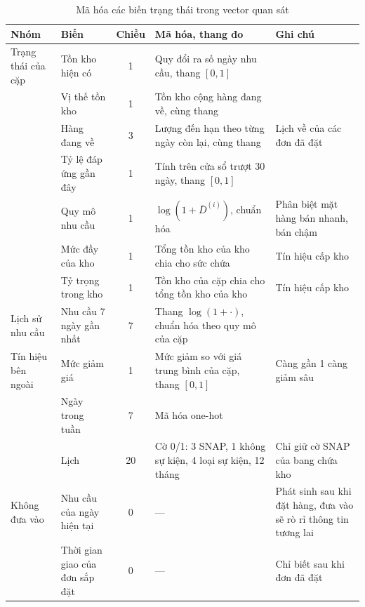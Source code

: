 \begin{table}[htbp]
    \centering
    \caption{Mã hóa các biến trạng thái trong vector quan sát}
    \label{tab:doiChieuState}
    \small
    \begin{tabular}{|>{\raggedright\arraybackslash}p{2.0cm}|>{\raggedright\arraybackslash}p{3.1cm}|c|>{\raggedright\arraybackslash}p{4.0cm}|>{\raggedright\arraybackslash}p{3.15cm}|}
        \hline
        Nhóm & Biến & Chiều & Mã hóa, thang đo & Ghi chú \\
        \hline
        Trạng thái của cặp & Tồn kho hiện có & 1 & Quy đổi ra số ngày nhu cầu, thang $[0,1]$ & \\ \cline{2-5}
         & Vị thế tồn kho & 1 & Tồn kho cộng hàng đang về, cùng thang & \\ \cline{2-5}
         & Hàng đang về & 3 & Lượng đến hạn theo từng ngày còn lại, cùng thang & Lịch về của các đơn đã đặt \\ \cline{2-5}
         & Tỷ lệ đáp ứng gần đây & 1 & Tính trên cửa sổ trượt 30 ngày, thang $[0,1]$ & \\ \cline{2-5}
         & Quy mô nhu cầu & 1 & $\log(1 + \bar{D}^{(i)})$, chuẩn hóa & Phân biệt mặt hàng bán nhanh, bán chậm \\ \cline{2-5}
         & Mức đầy của kho & 1 & Tổng tồn kho của kho chia cho sức chứa & Tín hiệu cấp kho \\ \cline{2-5}
         & Tỷ trọng trong kho & 1 & Tồn kho của cặp chia cho tổng tồn kho của kho & Tín hiệu cấp kho \\ \hline
        Lịch sử nhu cầu & Nhu cầu 7 ngày gần nhất & 7 & Thang $\log(1+\cdot)$, chuẩn hóa theo quy mô của cặp & \\ \hline
        Tín hiệu bên ngoài & Mức giảm giá & 1 & Mức giảm so với giá trung bình của cặp, thang $[0,1]$ & Càng gần 1 càng giảm sâu \\ \cline{2-5}
         & Ngày trong tuần & 7 & Mã hóa one-hot & \\ \cline{2-5}
         & Lịch & 20 & Cờ 0/1: 3 SNAP, 1 không sự kiện, 4 loại sự kiện, 12 tháng & Chỉ giữ cờ SNAP của bang chứa kho \\ \hline
        Không đưa vào & Nhu cầu của ngày hiện tại & 0 & --- & Phát sinh sau khi đặt hàng, đưa vào sẽ rò rỉ thông tin tương lai \\ \cline{2-5}
         & Thời gian giao của đơn sắp đặt & 0 & --- & Chỉ biết sau khi đơn đã đặt \\
        \hline
    \end{tabular}
\end{table}

